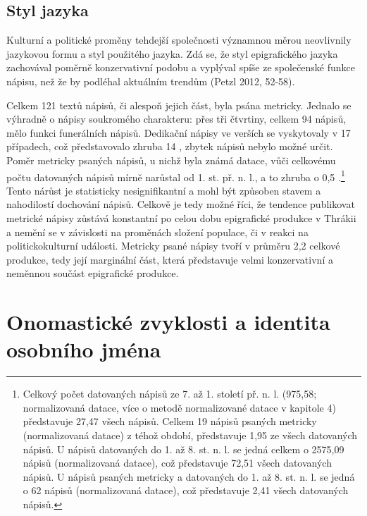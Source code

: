 \subsection[styl-jazyka]{Styl jazyka}

Kulturní a politické proměny tehdejší společnosti významnou měrou neovlivnily jazykovou formu a styl použitého jazyka. Zdá se, že styl epigrafického jazyka zachovával poměrně konzervativní podobu a vyplýval spíše ze společenské funkce nápisu, než že by podléhal aktuálním trendům (Petzl 2012, 52-58).

Celkem 121 textů nápisů, či alespoň jejich část, byla psána metricky. Jednalo se výhradně o nápisy soukromého charakteru: přes tři čtvrtiny, celkem 94 nápisů, mělo funkci funerálních nápisů. Dedikační nápisy ve verších se vyskytovaly v 17 případech, což představovalo zhruba 14 , zbytek nápisů nebylo možné určit. Poměr metricky psaných nápisů, u nichž byla známá datace, vůči celkovému počtu datovaných nápisů mírně narůstal od 1. st. př. n. l., a to zhruba o 0,5 .\footnote{Celkový počet datovaných nápisů ze 7. až 1. století př. n. l. (975,58; normalizovaná datace, více o metodě normalizované datace v kapitole 4) představuje 27,47  všech nápisů. Celkem 19 nápisů psaných metricky (normalizovaná datace) z téhož období, představuje 1,95  ze všech datovaných nápisů. U nápisů datovaných do 1. až 8. st. n. l. se jedná celkem o 2575,09 nápisů (normalizovaná datace), což představuje 72,51  všech datovaných nápisů. U nápisů psaných metricky a datovaných do 1. až 8. st. n. l. se jedná o 62 nápisů (normalizovaná datace), což představuje 2,41  všech datovaných nápisů.} Tento nárůst je statisticky nesignifikantní a mohl být způsoben stavem a nahodilostí dochování nápisů. Celkově je tedy možné říci, že tendence publikovat metrické nápisy zůstává konstantní po celou dobu epigrafické produkce v Thrákii a nemění se v závislosti na proměnách složení populace, či v reakci na politickokulturní události. Metricky psané nápisy tvoří v průměru 2,2  celkové produkce, tedy její marginální část, která představuje velmi konzervativní a neměnnou součást epigrafické produkce.

\section[onomastické-zvyklosti-a-identita-osobního-jména]{Onomastické zvyklosti a identita osobního jména}

